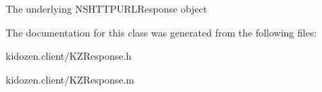 The underlying N\-S\-H\-T\-T\-P\-U\-R\-L\-Response object 

The documentation for this class was generated from the following files\-:\begin{DoxyCompactItemize}
\item 
kidozen.\-client/K\-Z\-Response.\-h\item 
kidozen.\-client/K\-Z\-Response.\-m\end{DoxyCompactItemize}
